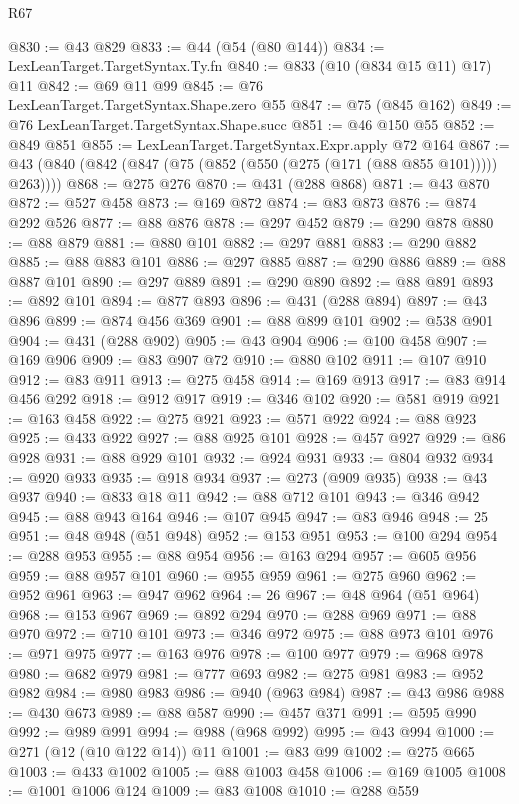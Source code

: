 \begin{lexlean}{R67}
\begin{coremodule}
@830 := @43 @829
@833 := @44 (@54 (@80 @144))
@834 := LexLeanTarget.TargetSyntax.Ty.fn
@840 := @833 (@10 (@834 @15 @11) @17) @11
@842 := @69 @11 @99
@845 := @76 LexLeanTarget.TargetSyntax.Shape.zero @55
@847 := @75 (@845 @162)
@849 := @76 LexLeanTarget.TargetSyntax.Shape.succ
@851 := @46 @150 @55
@852 := @849 @851
@855 := LexLeanTarget.TargetSyntax.Expr.apply @72 @164
@867 := @43 (@840 (@842 (@847 (@75 (@852 (@550 (@275 (@171 (@88 @855 @101))))) @263))))
@868 := @275 @276
@870 := @431 (@288 @868)
@871 := @43 @870
@872 := @527 @458
@873 := @169 @872
@874 := @83 @873
@876 := @874 @292 @526
@877 := @88 @876
@878 := @297 @452
@879 := @290 @878
@880 := @88 @879
@881 := @880 @101
@882 := @297 @881
@883 := @290 @882
@885 := @88 @883 @101
@886 := @297 @885
@887 := @290 @886
@889 := @88 @887 @101
@890 := @297 @889
@891 := @290 @890
@892 := @88 @891
@893 := @892 @101
@894 := @877 @893
@896 := @431 (@288 @894)
@897 := @43 @896
@899 := @874 @456 @369
@901 := @88 @899 @101
@902 := @538 @901
@904 := @431 (@288 @902)
@905 := @43 @904
@906 := @100 @458
@907 := @169 @906
@909 := @83 @907 @72
@910 := @880 @102
@911 := @107 @910
@912 := @83 @911
@913 := @275 @458
@914 := @169 @913
@917 := @83 @914 @456 @292
@918 := @912 @917
@919 := @346 @102
@920 := @581 @919
@921 := @163 @458
@922 := @275 @921
@923 := @571 @922
@924 := @88 @923
@925 := @433 @922
@927 := @88 @925 @101
@928 := @457 @927
@929 := @86 @928
@931 := @88 @929 @101
@932 := @924 @931
@933 := @804 @932
@934 := @920 @933
@935 := @918 @934
@937 := @273 (@909 @935)
@938 := @43 @937
@940 := @833 @18 @11
@942 := @88 @712 @101
@943 := @346 @942
@945 := @88 @943 @164
@946 := @107 @945
@947 := @83 @946
@948 := 25
@951 := @48 @948 (@51 @948)
@952 := @153 @951
@953 := @100 @294
@954 := @288 @953
@955 := @88 @954
@956 := @163 @294
@957 := @605 @956
@959 := @88 @957 @101
@960 := @955 @959
@961 := @275 @960
@962 := @952 @961
@963 := @947 @962
@964 := 26
@967 := @48 @964 (@51 @964)
@968 := @153 @967
@969 := @892 @294
@970 := @288 @969
@971 := @88 @970
@972 := @710 @101
@973 := @346 @972
@975 := @88 @973 @101
@976 := @971 @975
@977 := @163 @976
@978 := @100 @977
@979 := @968 @978
@980 := @682 @979
@981 := @777 @693
@982 := @275 @981
@983 := @952 @982
@984 := @980 @983
@986 := @940 (@963 @984)
@987 := @43 @986
@988 := @430 @673
@989 := @88 @587
@990 := @457 @371
@991 := @595 @990
@992 := @989 @991
@994 := @988 (@968 @992)
@995 := @43 @994
@1000 := @271 (@12 (@10 @122 @14)) @11
@1001 := @83 @99
@1002 := @275 @665
@1003 := @433 @1002
@1005 := @88 @1003 @458
@1006 := @169 @1005
@1008 := @1001 @1006 @124
@1009 := @83 @1008
@1010 := @288 @559

\end{coremodule}
\end{lexlean}
